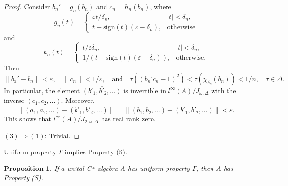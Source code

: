\documentclass[12pt, oneside, psamsfonts]{amsart}
\newtheorem{prop}[thm]{Proposition}
\theoremstyle{definition}
\theoremstyle{remark}
\numberwithin{equation}{section}
\newcommand{\norm}[1]{\| #1\|}
\newcommand{\abs}[1]{| #1 |}
\newcommand{\eps}{\varepsilon}
\begin{document}
\begin{proof}
Consider $b_n' = g_n(b_n)$ and $c_n = h_n(b_n)$, where
$$
g_n(t) = \left\{ \begin{array}{ll}
\eps t/\delta_n, & \abs{t} < \delta_n, \\
t + \mathrm{sign}(t)(\eps-\delta_n), & \mathrm{otherwise}
\end{array}\right.
$$
and
$$
h_n(t) = \left\{ \begin{array}{ll}
t/\eps\delta_n, & \abs{t} < \delta_n, \\
1/(t + \mathrm{sign}(t)(\eps-\delta_n)), & \mathrm{otherwise}.
\end{array}\right.
$$
Then 
$$\norm{b_n' - b_n} < \eps,\quad \norm{c_n} < 1/\eps,\quad \mathrm{and}\quad \tau((b_n'c_n - 1)^2) <\tau(\chi_{\delta_n}(b_n))< 1/n,\quad \tau \in \Delta.$$ In particular, the element $\overline{(b'_1, b'_2, ...)}$ is invertible in $l^\infty(A)/J_{\omega, \Delta}$ with the inverse $\overline{(c_1, c_2, ...)}$. Moreover, $$\norm{\overline{(a_1, a_2, ...)} - \overline{(b'_1, b'_2, ...)}} = \norm{\overline{(b_1, b_2, ...)} - \overline{(b'_1, b'_2, ...)}}< \eps.$$ This shows that $l^\infty(A)/ J_{2, \omega, \Delta}$ has real rank zero.

$(3) \Rightarrow (1)$: Trivial.
\end{proof}


Uniform property $\Gamma$ implies Property (S):
\begin{prop}\label{Property-S-Prop}
If a unital C*-algebra $A$ has uniform property $\Gamma$, then $A$ has Property (S).
\end{prop}
\end{document}
